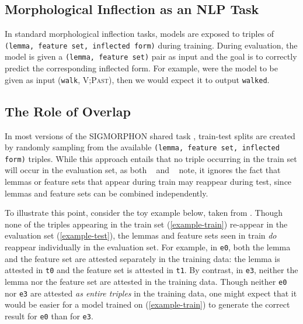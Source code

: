 \documentclass[11pt]{article}
\newcommand{\goldmant}{\citet{goldman-etal-2022-un}}
\newcommand{\kodnert}{\citet{kodner-etal-2022-sigmorphon}}
\begin{document}
\subsection{Morphological Inflection as an NLP Task}

In standard morphological inflection tasks, models are exposed to triples of \texttt{(lemma, feature set, inflected form)} during training.
During evaluation, the model is given a \texttt{(lemma, feature set)} pair as input and the goal is to correctly predict the corresponding inflected form.
For example,  were the model to be given as input (\texttt{walk}, \textsc{V;Past}), then we would expect it to output \texttt{walked}. 

\subsection{The Role of Overlap}
In most versions of the SIGMORPHON shared task \citep{cotterell-etal-2016-sigmorphon, cotterell-etal-2017-conll, cotterell-etal-2018-conll, mccarthy-etal-2019-sigmorphon, vylomova-etal-2020-sigmorphon, pimentel-ryskina-etal-2021-sigmorphon, goldman-etal-2023-sigmorphon}, train-test splits are created by randomly sampling from the available \texttt{(lemma, feature set, inflected form)} triples. 
While this approach entails that no triple occurring in the train set will occur in the evaluation set, as  both \goldmant~ and \kodnert~ note, it ignores the fact that lemmas or feature sets that appear during train may reappear during test, since lemmas and feature sets can be combined independently. 

To illustrate this point, consider the toy example below, taken from \citet{kodner-etal-2023-morphological}. 
Though none of the triples appearing in the train set (\ref{example-train}) re-appear in the evaluation set (\ref{example-test}), the lemmas and feature sets seen in train \textit{do} reappear individually in the evaluation set. 
For example, in \texttt{e0}, both the lemma and the feature set are attested separately in the training data: the lemma is attested in \texttt{t0} and the feature set is attested in \texttt{t1}. 
By contrast, in \texttt{e3}, neither the lemma nor the feature set are attested in the training data. 
Though neither \texttt{e0} nor \texttt{e3} are attested \textit{as entire triples} in the training data, one might expect that it would be easier for a model trained on (\ref{example-train}) to generate the correct result for \texttt{e0} than for \texttt{e3}. 
\end{document}
